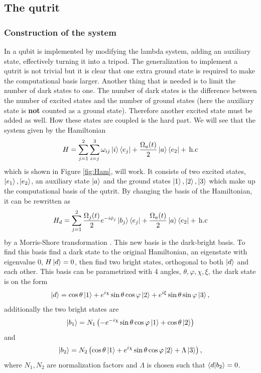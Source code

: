 \subsection{The qutrit}
\subsubsection{Construction of the system}
In \cite{darkpath} a qubit is implemented by modifying the lambda system, adding an auxiliary state, effectively turning it into a tripod. The generalization to implement a qutrit is not trivial but it is clear that one extra ground state is required to make the computational basis larger. Another thing that is needed is to limit the number of dark states to one. The number of dark states is the difference between the number of excited states and the number of ground states \cite{lambda} (here the auxiliary state is \textbf{not} counted as a ground state). Therefore another excited state must be added as well. How these states are coupled is the hard part. We will see that the system given by the Hamiltonian
\begin{equation}
\label{eq:Ham}
H = \sum_{j = 1}^2 \sum_{i =j}^{3} \omega_{ij}\ket{i}\bra{e_j}  + \frac{\Omega_{a}(t)}{2}\ket{a}\bra{e_2}  +\,\text{h.c}
\end{equation}
which is shown in Figure \ref{fig:Ham}, will work.  It consists of two excited states, $\ket{e_1}, \ket{e_2}$, an auxiliary state $\ket{a}$ and the ground states $\ket{1}, \ket{2}, \ket{3}$ which 
make up the computational basis of the qutrit. By changing the basis of the Hamiltonian, it can be rewritten as 
\begin{equation}
\label{eq:Hamd}
H_d = \sum_{j = 1}^2 \frac{\Omega_j(t)}{2}e^{-i\phi_j}\ket{b_j}\bra{e_j}  + \frac{\Omega_a(t)}{2}\ket{a}\bra{e_2}  +\,\text{h.c}
\end{equation} 
by a Morris-Shore transformation \cite{morris}. This new basis is the dark-bright basis. To find this basis find a dark state to the original  Hamiltonian, an eigenstate with eigenvalue $0$, $H\ket{d} = 0$, then find two bright states, orthogonal to both $\ket{d}$ and each other. This basis can be parametrized with 4 angles, $\theta, \varphi, \chi, \xi$, the dark state is on the form 
\begin{equation}
\ket{d} = \cos\theta\ket{1} + e^{i\chi}\sin\theta\cos\varphi\ket{2} + e^{i\xi}\sin\theta\sin\varphi\ket{3},
\end{equation}
additionally the two bright states are 
\begin{equation}
\ket{b_1} = N_1 \left(-e^{-i\chi}\sin\theta\cos\varphi\ket{1} + \cos\theta\ket{2}\right)
\end{equation} 
and
\begin{equation}
\ket{b_2} = N_2 \left(\cos\theta\ket{1} +  e^{i\chi}\sin\theta\cos\varphi\ket{2} + \Lambda \ket{3}\right),
\end{equation} where $N_1, N_2$ are normalization factors and $\Lambda$ is chosen such that $\bra{d}\ket{b_2} = 0$.

